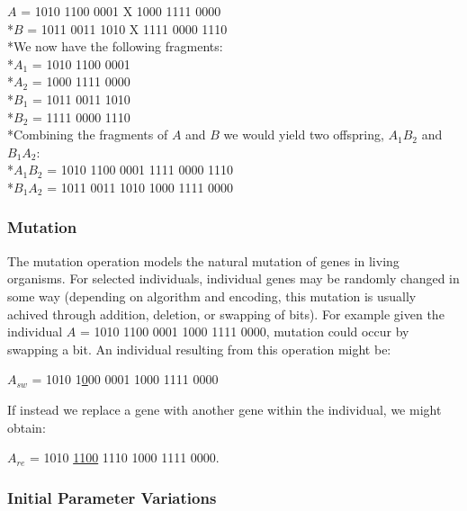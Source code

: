 \begin{center}
$A$ = 1010 1100 0001 X 1000 1111 0000
\\*$B$ = 1011 0011 1010 X 1111 0000 1110
\vspace{2 mm}
\\*We now have the following fragments: 
\\*$A_{1}$ = 1010 1100 0001 
\\*$A_{2}$ = 1000 1111 0000
\\*$B_{1}$ = 1011 0011 1010 
\\*$B_{2}$ = 1111 0000 1110
\vspace{2 mm}
\\*Combining the fragments of $A$ and $B$ we would yield two offspring, $A_{1}B_{2}$ and $B_{1}A_{2}$:
\vspace{2 mm}
\\*$A_{1}B_{2}$ = 1010 1100 0001 1111 0000 1110
\\*$B_{1}A_{2}$ = 1011 0011 1010 1000 1111 0000
\end{center}

\subsubsection{Mutation}
The mutation operation models the natural mutation of genes in living organisms. For selected individuals, individual genes may be randomly 
changed in some way (depending on algorithm and encoding, this mutation is usually achived through addition, deletion, or swapping of bits).
For example given the individual $A$ = 1010 1100 0001 1000 1111 0000, mutation could occur by swapping a bit. An individual resulting from this operation might be: 
\begin{center} $A_{sw}$ = 1010 1\underline{0}00 0001 1000 1111 0000 \end{center}
If instead we replace a gene with another gene within the individual, we might obtain:
\begin{center} $A_{re}$ =   1010 \underline{1100} 1110 1000 1111 0000.\end{center}
                                                           
\subsubsection{Initial Parameter Variations}

